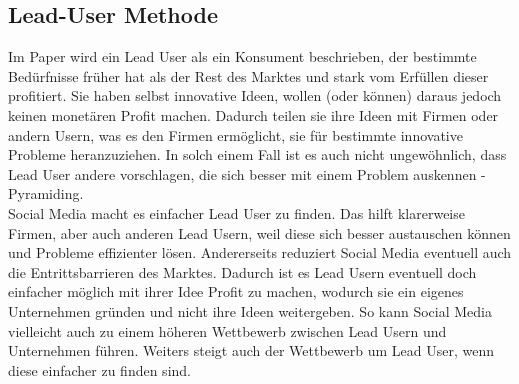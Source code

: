 \subsection{Lead-User Methode}
Im Paper wird ein Lead User als ein Konsument beschrieben, der bestimmte Bed\"urfnisse fr\"uher hat als der Rest des Marktes und stark vom Erf\"ullen dieser profitiert. Sie haben selbst innovative Ideen, wollen (oder k\"onnen) daraus jedoch keinen monet\"aren Profit machen. Dadurch teilen sie ihre Ideen mit Firmen oder andern Usern, was es den Firmen erm\"oglicht, sie f\"ur bestimmte innovative Probleme heranzuziehen. In solch einem Fall ist es auch nicht ungew\"ohnlich, dass Lead User andere vorschlagen, die sich besser mit einem Problem auskennen - Pyramiding.\\
Social Media macht es einfacher Lead User zu finden. Das hilft klarerweise Firmen, aber auch anderen Lead Usern, weil diese sich besser austauschen k\"onnen und Probleme effizienter l\"osen. Andererseits reduziert Social Media eventuell auch die Entrittsbarrieren des Marktes. Dadurch ist es Lead Usern eventuell doch einfacher m\"oglich mit ihrer Idee Profit zu machen, wodurch sie ein eigenes Unternehmen gr\"unden und nicht ihre Ideen weitergeben. So kann Social Media vielleicht auch zu einem h\"oheren Wettbewerb zwischen Lead Usern und Unternehmen f\"uhren. Weiters steigt auch der Wettbewerb um Lead User, wenn diese einfacher zu finden sind.













